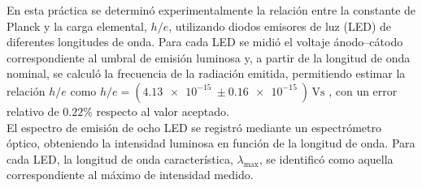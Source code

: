En esta práctica se determinó experimentalmente la relación entre la constante de
Planck y la carga elemental, $h/e$, utilizando diodos emisores de luz (LED) de
diferentes longitudes de onda. Para cada LED se midió el voltaje ánodo--cátodo
correspondiente al umbral de emisión luminosa y, a partir de la longitud de onda
nominal, se calculó la frecuencia de la radiación emitida, permitiendo estimar la relación $h/e$ como $h/e =\left(
\SI{4.13e-15}{} \pm \SI{0.16e-15}{}
\right)\,\si{\volt\second}$ , con un error relativo de $0.22\%$ respecto al valor aceptado.\\


El espectro de emisión de ocho LED se registró mediante un espectrómetro óptico, obteniendo la intensidad luminosa en función de la longitud de onda. Para cada LED, la longitud de onda característica, $\lambda_{\max}$, se identificó como aquella correspondiente al máximo de intensidad medido.\\
